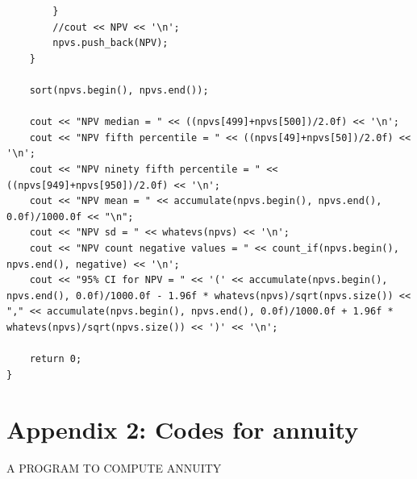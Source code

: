 \documentclass{report}
\begin{document}
\begin{verbatim}
        }
        //cout << NPV << '\n';
        npvs.push_back(NPV);
    }

    sort(npvs.begin(), npvs.end());

    cout << "NPV median = " << ((npvs[499]+npvs[500])/2.0f) << '\n';
    cout << "NPV fifth percentile = " << ((npvs[49]+npvs[50])/2.0f) << '\n';
    cout << "NPV ninety fifth percentile = " << ((npvs[949]+npvs[950])/2.0f) << '\n';
    cout << "NPV mean = " << accumulate(npvs.begin(), npvs.end(), 0.0f)/1000.0f << "\n";
    cout << "NPV sd = " << whatevs(npvs) << '\n';
    cout << "NPV count negative values = " << count_if(npvs.begin(), npvs.end(), negative) << '\n';
    cout << "95% CI for NPV = " << '(' << accumulate(npvs.begin(), npvs.end(), 0.0f)/1000.0f - 1.96f * whatevs(npvs)/sqrt(npvs.size()) << "," << accumulate(npvs.begin(), npvs.end(), 0.0f)/1000.0f + 1.96f * whatevs(npvs)/sqrt(npvs.size()) << ')' << '\n';
     
    return 0;
}
\end{verbatim}    


\chapter*{Appendix 2: Codes for annuity}

\begin{center}
   {\Large A PROGRAM TO COMPUTE ANNUITY}
\end{center}
\end{document}
